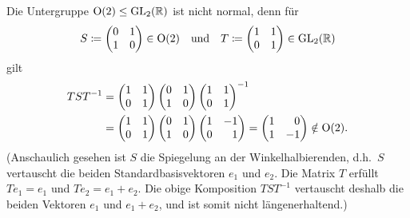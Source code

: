 Die Untergruppe $\operatorname{O}(2) \leq \operatorname{GL}_{2}(\mathbb{R})$ ist nicht normal, denn für
\[
            S
  \coloneqq \begin{pmatrix}
              0 & 1 \\
              1 & 0
            \end{pmatrix}
  \in \operatorname{O}(2)
  \quad\text{und}\quad
            T
  \coloneqq \begin{pmatrix}
              1 & 1 \\
              0 & 1
            \end{pmatrix}
  \in \operatorname{GL}_{2}(\mathbb{R})
\]
gilt
\begin{align*}
      T S T^{-1}
  &=  \begin{pmatrix}
        1 & 1 \\
        0 & 1
      \end{pmatrix}
      \begin{pmatrix}
        0 & 1 \\
        1 & 0
      \end{pmatrix}
      \begin{pmatrix}
        1 & 1 \\
        0 & 1
      \end{pmatrix}^{-1}
  \\
  &=  \begin{pmatrix}
        1 & 1 \\
        0 & 1
      \end{pmatrix}
      \begin{pmatrix}
        0 & 1 \\
        1 & 0
      \end{pmatrix}
      \begin{pmatrix*}[r]
        1 & -1 \\
        0 &  1
      \end{pmatrix*}
  =   \begin{pmatrix*}[r]
        1 &  0  \\
        1 & -1
      \end{pmatrix*}
  \notin \orthogonal{2}.
\end{align*}
(Anschaulich gesehen ist $S$ die Spiegelung an der Winkelhalbierenden, d.h.\ $S$ vertauscht die beiden Standardbasisvektoren $e_1$ und $e_2$.
Die Matrix $T$ erfüllt $Te_1 = e_1$ und $Te_2 = e_1 + e_2$.
Die obige Komposition $T S T^{-1}$ vertauscht deshalb die beiden Vektoren $e_1$ und $e_1 + e_2$, und ist somit nicht längenerhaltend.)





